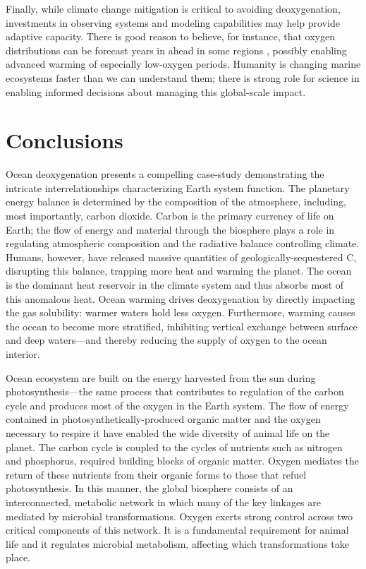 \documentclass{report_chapter}
\begin{document}
Finally, while climate change mitigation is critical to avoiding deoxygenation, investments in observing systems and modeling capabilities may help provide adaptive capacity.
There is good reason to believe, for instance, that oxygen distributions can be forecast years in ahead in some regions \citep[e.g.,][]{Pozo-Buil-Di-Lorenzo-2017}, possibly enabling advanced warming of especially low-oxygen periods.
Humanity is changing marine ecosystems faster than we can understand them; there is strong role for science in enabling informed decisions about managing this global-scale impact.

\section{Conclusions}

Ocean deoxygenation presents a compelling case-study demonstrating the intricate interrelationships characterizing Earth system function.
The planetary energy balance is determined by the composition of the atmosphere, including, most importantly, carbon dioxide.
Carbon is the primary currency of life on Earth; the flow of energy and material through the biosphere plays a role in regulating atmospheric composition and the radiative balance controlling climate.
Humans, however, have released massive quantities of geologically-sequestered C\OO{}, disrupting this balance, trapping more heat and warming the planet.
The ocean is the dominant heat reservoir in the climate system and thus absorbs most of this anomalous heat.
Ocean warming drives deoxygenation by directly impacting the gas solubility: warmer waters hold less oxygen.
Furthermore, warming causes the ocean to become more stratified, inhibiting vertical exchange between surface and deep waters---and thereby reducing the supply of oxygen to the ocean interior.

Ocean ecosystem are built on the energy harvested from the sun during photosynthesis---the same process that contributes to regulation of the carbon cycle and produces most of the oxygen in the Earth system.
The flow of energy contained in photosynthetically-produced organic matter and the oxygen necessary to respire it have enabled the wide diversity of animal life on the planet.
The carbon cycle is coupled to the cycles of nutrients such as nitrogen and phosphorus, required building blocks of organic matter.
Oxygen mediates the return of these nutrients from their organic forms to those that refuel photosynthesis.
In this manner, the global biosphere consists of an interconnected, metabolic network in which many of the key linkages are mediated by microbial transformations.
Oxygen exerts strong control across two critical components of this network.
It is a fundamental requirement for animal life and it regulates microbial metabolism, affecting which transformations take place.
\end{document}
